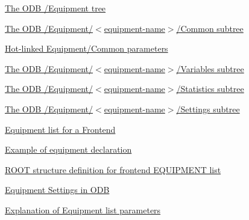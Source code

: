 \begin{TabularC}{2}
\begin{TabularC}{2}
\begin{DoxyItemize}
\item \hyperlink{FE_ODB_equipment_tree}{The ODB /Equipment tree} 
\begin{DoxyItemize}
\item \hyperlink{FE_ODB_equipment_tree_FE_ODB_equipment_common}{The ODB /Equipment/$<$equipment-\/name$>$/Common subtree} 
\begin{DoxyItemize}
\item \hyperlink{FE_ODB_equipment_tree_FE_equipment_odb_hot_links}{Hot-\/linked Equipment/Common parameters} 
\end{DoxyItemize}
\item \hyperlink{FE_ODB_equipment_tree_FE_ODB_equipment_variables}{The ODB /Equipment/$<$equipment-\/name$>$/Variables subtree} 
\item \hyperlink{FE_ODB_equipment_tree_FE_ODB_equipment_statistics}{The ODB /Equipment/$<$equipment-\/name$>$/Statistics subtree} 
\item \hyperlink{FE_ODB_equipment_tree_FE_ODB_equipment_settings}{The ODB /Equipment/$<$equipment-\/name$>$/Settings subtree} 
\end{DoxyItemize}\par
 
\item \hyperlink{FE_eqdec}{Equipment list for a Frontend} 
\begin{DoxyItemize}
\item \hyperlink{FE_eqdec_FE_Example_equipment_structure}{Example of equipment declaration} 
\item \hyperlink{FE_eqdec_FE_ROOT_Structure_Def}{ROOT structure definition for frontend EQUIPMENT list} 
\item \hyperlink{FE_eqdec_FE_equipment_odb_common}{Equipment Settings in ODB} 
\end{DoxyItemize}\par
 
\item \hyperlink{FE_table}{Explanation of Equipment list parameters} \par
 

\end{DoxyItemize}
\end{TabularC}
\end{TabularC}
